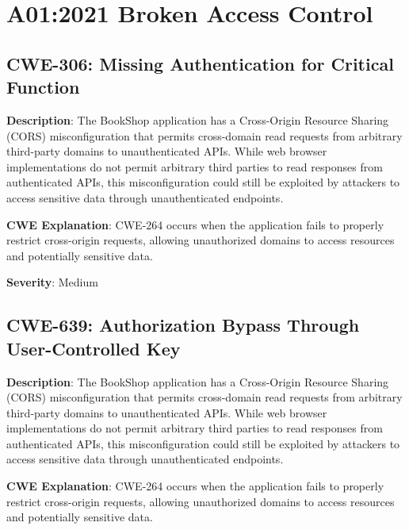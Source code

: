 \documentclass[]{UCD_CS_FYP_Report}
\begin{document}
\maketitle


\tableofcontents{}\newpage
\newpage



\chapter{A01:2021 Broken Access Control}


\section{CWE-306: Missing Authentication for Critical Function}

\textbf{Description}: The BookShop application has a Cross-Origin Resource Sharing (CORS) misconfiguration that permits cross-domain read requests from arbitrary third-party domains to unauthenticated APIs. While web browser implementations do not permit arbitrary third parties to read responses from authenticated APIs, this misconfiguration could still be exploited by attackers to access sensitive data through unauthenticated endpoints.

\textbf{CWE Explanation}: CWE-264 occurs when the application fails to properly restrict cross-origin requests, allowing unauthorized domains to access resources and potentially sensitive data.

\textbf{Severity}: Medium

\section{CWE-639: Authorization Bypass Through User-Controlled Key}

\textbf{Description}: The BookShop application has a Cross-Origin Resource Sharing (CORS) misconfiguration that permits cross-domain read requests from arbitrary third-party domains to unauthenticated APIs. While web browser implementations do not permit arbitrary third parties to read responses from authenticated APIs, this misconfiguration could still be exploited by attackers to access sensitive data through unauthenticated endpoints.

\textbf{CWE Explanation}: CWE-264 occurs when the application fails to properly restrict cross-origin requests, allowing unauthorized domains to access resources and potentially sensitive data.
\end{document}
